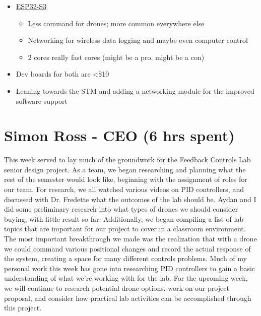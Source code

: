\documentclass[12pt, titlepage]{article}
\begin{document}
\begin{itemize}
\begin{itemize}
\begin{itemize}
		\end{itemize}
	\item \href{https://esp32s3.com/}{ESP32-S3}
		\begin{itemize}
		\item Less command for drones; more common everywhere else
		\item Networking for wireless data logging and maybe even computer control
		\item 2 cores really fast cores (might be a pro, might be a con)
		\end{itemize}
	\item Dev boards for both are <\$10
	\item Leaning towards the STM and adding a networking module for the improved software support
	\end{itemize}
\end{itemize} 

\section*{Simon Ross - CEO (6 hrs spent)}

This week served to lay much of the groundwork for the Feedback Controls Lab senior design project. As a team, we began researching and planning what the rest of the semester would look like, beginning with the assignment of roles for our team. For research, we all watched various videos on PID controllers, and discussed with Dr. Fredette what the outcomes of the lab should be. Aydan and I did some preliminary research into what types of drones we should consider buying, with little result so far. Additionally, we began compiling a list of lab topics that are important for our project to cover in a classroom environment. The most important breakthrough we made was the realization that with a drone we could command various positional changes and record the actual response of the system, creating a space for many different controls problems. Much of my personal work this week has gone into researching PID controllers to gain a basic understanding of what we’re working with for the lab. For the upcoming week, we will continue to research potential drone options, work on our project proposal, and consider how practical lab activities can be accomplished through this project.
\end{document}

